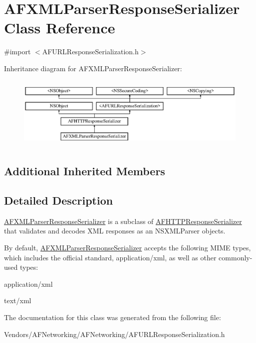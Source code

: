 \hypertarget{interface_a_f_x_m_l_parser_response_serializer}{}\section{A\+F\+X\+M\+L\+Parser\+Response\+Serializer Class Reference}
\label{interface_a_f_x_m_l_parser_response_serializer}


{\ttfamily \#import $<$A\+F\+U\+R\+L\+Response\+Serialization.\+h$>$}

Inheritance diagram for A\+F\+X\+M\+L\+Parser\+Response\+Serializer\+:\begin{figure}[H]
\begin{center}
\leavevmode
\includegraphics[height=3.538705cm]{interface_a_f_x_m_l_parser_response_serializer}
\end{center}
\end{figure}
\subsection*{Additional Inherited Members}


\subsection{Detailed Description}
{\ttfamily \hyperlink{interface_a_f_x_m_l_parser_response_serializer}{A\+F\+X\+M\+L\+Parser\+Response\+Serializer}} is a subclass of {\ttfamily \hyperlink{interface_a_f_h_t_t_p_response_serializer}{A\+F\+H\+T\+T\+P\+Response\+Serializer}} that validates and decodes X\+M\+L responses as an {\ttfamily N\+S\+X\+M\+L\+Parser} objects.

By default, {\ttfamily \hyperlink{interface_a_f_x_m_l_parser_response_serializer}{A\+F\+X\+M\+L\+Parser\+Response\+Serializer}} accepts the following M\+I\+M\+E types, which includes the official standard, {\ttfamily application/xml}, as well as other commonly-\/used types\+:


\begin{DoxyItemize}
\item {\ttfamily application/xml}
\item {\ttfamily text/xml} 
\end{DoxyItemize}

The documentation for this class was generated from the following file\+:\begin{DoxyCompactItemize}
\item 
Vendors/\+A\+F\+Networking/\+A\+F\+Networking/A\+F\+U\+R\+L\+Response\+Serialization.\+h\end{DoxyCompactItemize}

